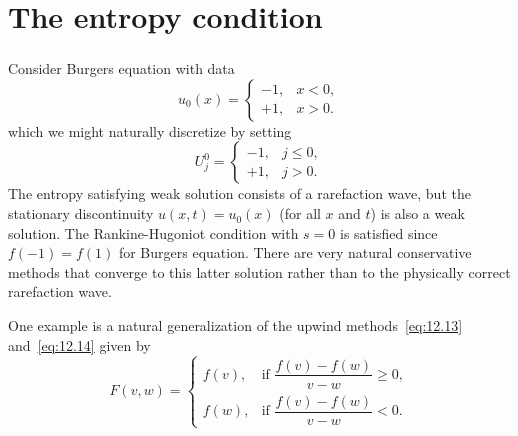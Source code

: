 \section{The entropy condition}

\begin{frame}
    \frametitle{\secname}

    \begin{example}
        Consider Burgers equation with data
        \begin{equation}\tag{12.49}
            u_{0}
            \left(x\right)=
            \begin{cases}
                -1, & x<0, \\
                +1, & x>0.
            \end{cases}
        \end{equation}
        which we might naturally discretize by setting
        \begin{equation}\tag{12.50}
            U^{0}_{j}=
            \begin{cases}
                -1, & j\leq 0, \\
                +1, & j>0.
            \end{cases}
        \end{equation}
        The entropy satisfying weak solution consists of a
        rarefaction wave, but the stationary discontinuity
        \begin{math}
            u
            \left(x,t\right)=
            u_{0}
            \left(x\right)
        \end{math}
        (for all $x$ and $t$) is also a weak solution.
        The Rankine-Hugoniot condition with $s=0$ is satisfied since
        \begin{math}
            f\left(-1\right)=
            f\left(1\right)
        \end{math}
        for Burgers equation.
        There are very natural conservative methods that converge to
        this latter solution rather than to the physically correct
        rarefaction wave.
    \end{example}

    One example is a natural generalization of the upwind
    methods~\eqref{eq:12.13} and~\eqref{eq:12.14} given by
    \begin{equation}\tag{12.51}\label{eq:12.51}
        F\left(v,w\right)=
        \begin{cases}
            f\left(v\right), &
            \text{if }\dfrac{f\left(v\right)-f\left(w\right)}{v-w}\geq 0, \\
            f\left(w\right), &
            \text{if }\dfrac{f\left(v\right)-f\left(w\right)}{v-w}< 0.
        \end{cases}
    \end{equation}
\end{frame}